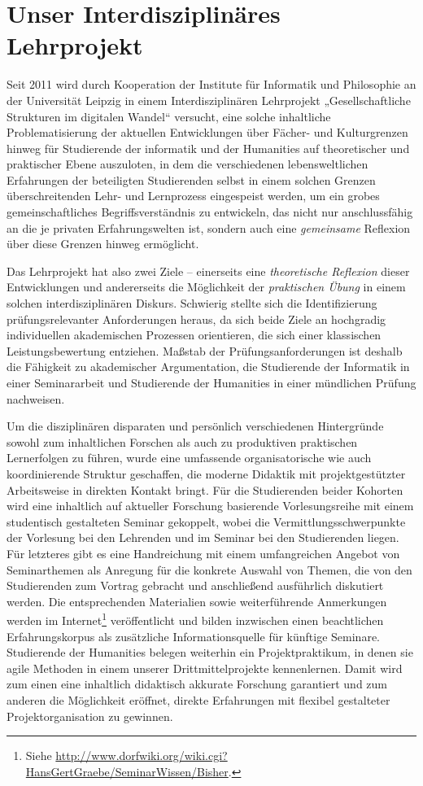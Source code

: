 \documentclass[a4paper,11pt]{article}
\begin{document}
\section*{Unser Interdisziplinäres Lehrprojekt}

Seit 2011 wird durch Kooperation der Institute für Informatik und Philosophie
an der Universität Leipzig in einem Interdisziplinären Lehrprojekt
„Gesellschaftliche Strukturen im digitalen Wandel“ versucht, eine solche
inhaltliche Problematisierung der aktuellen Entwicklungen über Fächer- und
Kulturgrenzen hinweg für Studierende der informatik und der Humanities auf
theoretischer und praktischer Ebene auszuloten, in dem die verschiedenen
lebensweltlichen Erfahrungen der beteiligten Studierenden selbst in einem
solchen Grenzen überschreitenden Lehr- und Lernprozess eingespeist werden, um
ein grobes gemeinschaftliches Begriffsverständnis zu entwickeln, das nicht nur
anschlussfähig an die je privaten Erfahrungswelten ist, sondern auch eine
\emph{gemeinsame} Reflexion über diese Grenzen hinweg ermöglicht.

Das Lehrprojekt hat also zwei Ziele – einerseits eine \emph{theoretische
  Reflexion} dieser Entwicklungen und andererseits die Möglichkeit der
\emph{praktischen Übung} in einem solchen interdisziplinären Diskurs.
Schwierig stellte sich die Identifizierung prüfungsrelevanter Anforderungen
heraus, da sich beide Ziele an hochgradig individuellen akademischen Prozessen
orientieren, die sich einer klassischen Leistungsbewertung entziehen. Maßstab
der Prüfungsanforderungen ist deshalb die Fähigkeit zu akademischer
Argumentation, die Studierende der Informatik in einer Seminararbeit und
Studierende der Humanities in einer mündlichen Prüfung nachweisen.

Um die disziplinären disparaten und persönlich verschiedenen Hintergründe
sowohl zum inhaltlichen Forschen als auch zu produktiven praktischen
Lernerfolgen zu führen, wurde eine umfassende organisatorische wie auch
koordinierende Struktur geschaffen, die moderne Didaktik mit projektgestützter
Arbeitsweise in direkten Kontakt bringt. Für die Studierenden beider Kohorten
wird eine inhaltlich auf aktueller Forschung basierende Vorlesungsreihe mit
einem studentisch gestalteten Seminar gekoppelt, wobei die
Vermittlungsschwerpunkte der Vorlesung bei den Lehrenden und im Seminar bei
den Studierenden liegen. Für letzteres gibt es eine Handreichung mit einem
umfangreichen Angebot von Seminarthemen als Anregung für die konkrete Auswahl
von Themen, die von den Studierenden zum Vortrag gebracht und anschließend
ausführlich diskutiert werden. Die entsprechenden Materialien sowie
weiterführende Anmerkungen werden im Internet\footnote{Siehe
  \url{http://www.dorfwiki.org/wiki.cgi?HansGertGraebe/SeminarWissen/Bisher}.}
veröffentlicht und bilden inzwischen einen beachtlichen Erfahrungskorpus als
zusätzliche Informationsquelle für künftige Seminare. Studierende der
Humanities belegen weiterhin ein Projektpraktikum, in denen sie agile Methoden
in einem unserer Drittmittelprojekte kennenlernen. Damit wird zum einen eine
inhaltlich didaktisch akkurate Forschung garantiert und zum anderen die
Möglichkeit eröffnet, direkte Erfahrungen mit flexibel gestalteter
Projektorganisation zu gewinnen.
\end{document}
